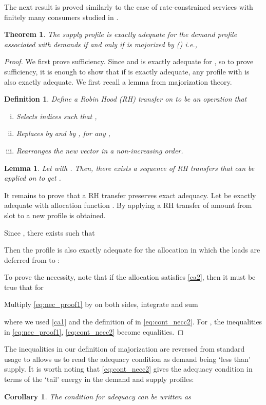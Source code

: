 \documentclass[10pt,draftcls,onecolumn]{IEEEtran}
\newtheorem{theorem}{Theorem}
\newtheorem{definition}{Definition}
\newtheorem{lemma}{Lemma}
\newtheorem{corollary}{Corollary}
\newcounter{l1}
\newcounter{l2}
\newcounter{l3}
\begin{document}
The next result is proved similarly to  the case of rate-constrained services with finitely many consumers studied in \cite{dd2013}.
\begin{theorem}\label{thm:cont_adequacy}
The supply profile   is exactly adequate for the demand profile   associated with demands   if and only if  is majorized by  () i.e., 

\end{theorem}
\begin{proof}
We first prove sufficiency.
Since  and  is exactly adequate for , so to prove sufficiency, it is enough to show  that if  is exactly adequate, any  profile with  is also exactly adequate.  We first recall a  lemma from majorization theory.
\begin{definition}
Define a \textit{Robin Hood (RH)} transfer on  to be an operation that
\begin{enumerate}[(i)]
\item Selects indices  such that ,
\item Replaces  by  and  by , for any ,
\item Rearranges the new vector in a non-increasing order.
\end{enumerate}
\end{definition}
\begin{lemma}  \cite{arnold}
Let  with . Then, there exists a sequence of RH transfers that can be applied on  to get . 
\end{lemma}

It remains to prove that a RH transfer preserves exact adequacy. Let   be exactly adequate  with allocation function . By applying a RH transfer of amount  from slot  to  a new profile  is obtained. 

Since , there exists  such that 

Then the profile  is also exactly adequate for the allocation  in which the loads  are deferred from  to :
 
To prove the necessity, note that if the allocation   satisfies \eqref{ca2}, then it must be true that for 

Multiply  \eqref{eq:nec_proof1} by  on both sides, integrate and sum

where we used \eqref{ca1} and the definition of  in \eqref{eq:cont_necc2}. For , the inequalities in \eqref{eq:nec_proof1}, \eqref{eq:cont_necc2} become equalities. 
\end{proof}



 The inequalities in our definition of majorization are reversed from standard usage to allows us to read the adequacy condition
   as demand being `less than' supply.
It is worth noting that \eqref{eq:cont_necc2} gives the adequacy condition in terms of  the `tail' energy in the demand and supply profiles:
\begin{corollary}\label{cor:cont_adequacy}
The condition for adequacy  can be written as

\end{corollary}
\end{document}
